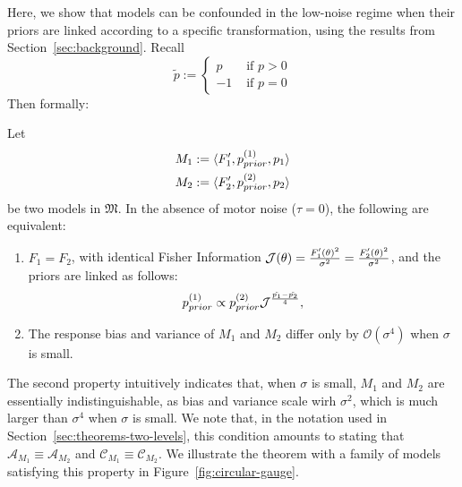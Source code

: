 Here, we show that models can be confounded in the low-noise regime when their priors are linked according to a specific transformation, using the results from Section~\ref{sec:background}.
Recall
\begin{equation}\label{eq:tilde-p-also2}
    \tilde{p} := \begin{cases} p &\text{ if } p > 0 \\ -1 & \text{ if } p=0\end{cases}
\end{equation}
Then formally:
\begin{thm}
Let 
\begin{align*}
    M_1 := \langle F'_1, p_{prior}^{(1)}, p_1 \rangle \\
    M_2 := \langle F'_2, p_{prior}^{(2)}, p_2 \rangle 
\end{align*}
be two models in $\mathfrak{M}$. In the absence of motor noise ($\tau=0$), the following are equivalent:
\begin{enumerate}
    \item $F_1 = F_2$, with identical Fisher Information $\mathcal{J}(\theta) = \frac{F_1'(\theta)^2}{\sigma^2} = \frac{F_2'(\theta)^2}{\sigma^2}$, and the priors are linked as follows:
\begin{equation}\label{eq:prior-transformation}
    p_{prior}^{(1)} \propto p_{prior}^{(2)}  \mathcal{J}^{\frac{\tilde{p_1}-\tilde{p_2}}{4}},
\end{equation}
\item The response bias and variance of $M_1$ and $M_2$ differ only by $\mathcal{O}(\sigma^4)$ when $\sigma$ is small.
\end{enumerate}
\end{thm}
The second property intuitively indicates that, when $\sigma$ is small, $M_1$ and $M_2$ are essentially indistinguishable, as bias and variance scale wirh $\sigma^2$, which is much larger than $\sigma^4$ when $\sigma$ is small. We note that, in the notation used in Section~\ref{sec:theorems-two-levels}, this condition amounts to stating that $\mathcal{A}_{M_1} \equiv \mathcal{A}_{M_2}$ and $\mathcal{C}_{M_1} \equiv \mathcal{C}_{M_2}$.
We illustrate the theorem with a family of models satisfying this property in Figure~\ref{fig:circular-gauge}.
